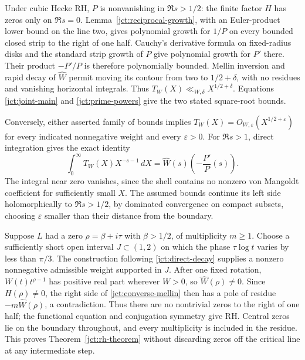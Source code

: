Under cubic Hecke RH, \(P\) is nonvanishing in \(\Re s>1/2\):
the finite factor \(H\) has zeros only on \(\Re s=0\).
Lemma~\ref{jct:reciprocal-growth}, with an Euler-product lower
bound on the line two, gives polynomial growth for \(1/P\)
on every bounded closed strip to the right of one half.
Cauchy's derivative formula on fixed-radius disks and the standard
strip growth of \(P\) give polynomial growth for \(P'\) there.
Their product \(-P'/P\) is therefore polynomially bounded.
Mellin inversion and rapid decay of \(\widehat W\) permit
moving its contour from two to \(1/2+\delta\), with no
residues and vanishing horizontal integrals.  Thus
\(T_W(X)\ll_{W,\delta}X^{1/2+\delta}\).
Equations \eqref{jct:joint-main} and \eqref{jct:prime-powers}
give the two stated square-root bounds.

Conversely, either asserted family of bounds implies
\(T_W(X)=O_{W,\varepsilon}(X^{1/2+\varepsilon})\) for every
indicated nonnegative weight and every \(\varepsilon>0\).
For \(\Re s>1\), direct integration gives the exact identity
\begin{equation}
 \int_0^\infty T_W(X)X^{-s-1}\,dX
 =\widehat W(s)\left(-\frac{P'}P(s)\right).
 \label{jct:converse-mellin}
\end{equation}
The integral near zero vanishes, since the shell contains no
nonzero von Mangoldt coefficient for sufficiently small \(X\).
The assumed bounds continue its left side holomorphically to
\(\Re s>1/2\), by dominated convergence on compact subsets,
choosing \(\varepsilon\) smaller than their distance from the
boundary.

Suppose \(L\) had a zero \(\rho=\beta+i\tau\) with
\(\beta>1/2\), of multiplicity \(m\ge1\).
Choose a sufficiently short open interval \(J\subset(1,2)\)
on which the phase \(\tau\log t\) varies by less than
\(\pi/3\).  The construction following
\eqref{jct:direct-decay} supplies a nonzero nonnegative admissible
weight supported in \(J\).  After one fixed rotation,
\(W(t)t^{\rho-1}\) has positive real part wherever \(W>0\),
so \(\widehat W(\rho)\ne0\).
Since \(H(\rho)\ne0\), the right side of
\eqref{jct:converse-mellin} then has a pole of residue
\(-m\widehat W(\rho)\), a contradiction.
Thus there are no nontrivial zeros to the right of one half;
the functional equation and conjugation symmetry give RH.
Central zeros lie on the boundary throughout, and every
multiplicity is included in the residue.
This proves Theorem~\ref{jct:rh-theorem} without discarding
zeros off the critical line at any intermediate step.

